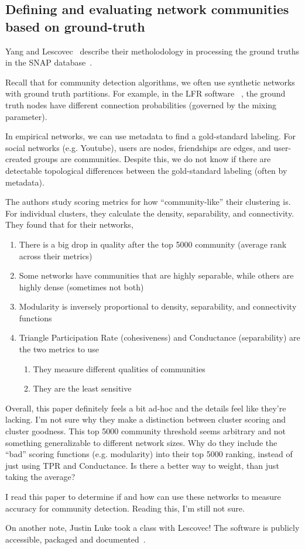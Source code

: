 \documentclass[../../main/main.tex]{subfiles}
\begin{document}
\subsection*{Defining and evaluating network communities based on ground-truth}

Yang and Lescovec~\cite{yang13-10} describe their metholodology in processing the ground truths in the SNAP database~\cite{lescovec14-06}.

Recall that for community detection algorithms, we often use synthetic networks with ground truth partitions.
For example, in the LFR software ~\cite{lancichinetti08-00}, the ground truth nodes have different connection probabilities (governed by the mixing parameter).

In empirical networks, we can use metadata to find a gold-standard labeling.
For social networks (e.g. Youtube), users are nodes, friendships are edges, and user-created groups are communities.
Despite this, we do not know if there are detectable topological differences between the gold-standard labeling (often by metadata).

The authors study scoring metrics for how ``community-like'' their clustering is.
For individual clusters, they calculate the density, separability, and connectivity.
They found that for their networks,
\begin{enumerate}
    \item There is a big drop in quality after the top 5000 community (average rank across their metrics)
    \item Some networks have communities that are highly separable, while others are highly dense (sometimes not both)
    \item Modularity is inversely proportional to density, separability, and connectivity functions
    \item Triangle Participation Rate (cohesiveness) and Conductance (separability) are the two metrics to use
        \begin{enumerate}
            \item They measure different qualities of communities
            \item They are the least sensitive
        \end{enumerate}
\end{enumerate}

Overall, this paper definitely feels a bit ad-hoc and the details feel like they're lacking.
I'm not sure why they make a distinction between cluster scoring and cluster goodness.
This top 5000 community threshold seems arbitrary and not something generalizable to different network sizes.
Why do they include the ``bad'' scoring functions (e.g. modularity) into their top 5000 ranking, instead of just using TPR and Conductance.
Is there a better way to weight, than just taking the average?

I read this paper to determine if and how can use these networks to measure accuracy for community detection.
Reading this, I'm still not sure.

On another note, Justin Luke took a class with Lescovec!
The software is publicly accessible, packaged and documented~\cite{snap25-06}.

\bibsub
\end{document}
